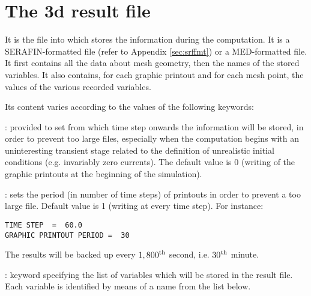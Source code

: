 \section{The 3d result file}
\label{sec:3dres}
It is the file into which  stores the information during the
computation. It is a SERAFIN-formatted file (refer to Appendix
\ref{sec:srffmt}) or a MED-formatted file. It first contains all the data about
mesh geometry, then the names of the stored variables. It also contains, for
each graphic printout and for each mesh point, the values of the various
recorded variables.

Its content varies according to the values of the following keywords:

: provided to set from
which time step onwards the information will be stored, in order to prevent too
large files, especially when the computation begins with an uninteresting
transient stage related to the definition of unrealistic initial conditions
(e.g. invariably zero currents). The default value is 0 (writing of the graphic
printouts at the beginning of the simulation).

: sets the period (in number of time steps) of
printouts in order to prevent a too large file.  Default value is 1 (writing at
every time step). For instance:

\begin{lstlisting}[language=TelemacCas]
TIME STEP  =  60.0
GRAPHIC PRINTOUT PERIOD =  30
\end{lstlisting}

The results will be backed up every ${1,800}^{\rm{th}}$ second, i.e.
${30}^{\rm{th}}$ minute.

: keyword specifying the list of
variables which will be stored in the result file. Each variable is identified
by means of a name from the list below.

